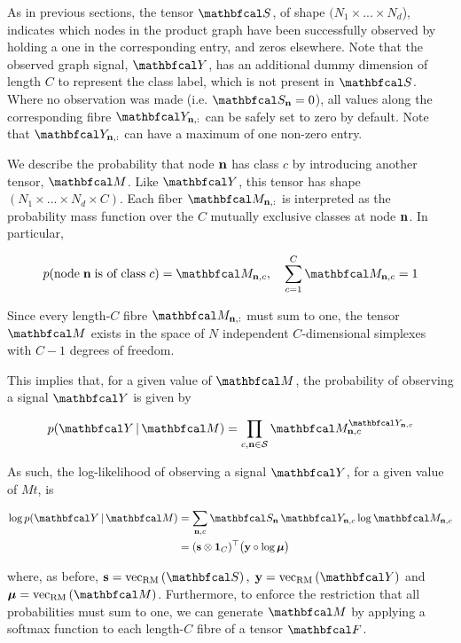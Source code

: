 As in previous sections, the tensor $\St$, of shape $(N_1 \times ... \times N_d$), indicates which nodes in the product graph have been successfully observed by holding a one in the corresponding entry, and zeros elsewhere. Note that the observed graph signal, $\Yt$, has an additional dummy dimension of length $C$ to represent the class label, which is not present in $\St$. Where no observation was made (i.e. $\St_{\nn} = 0$), all values along the corresponding fibre $\Yt_{\nn, :}$ can be safely set to zero by default. Note that $\Yt_{\nn, :}$ can have a maximum of one non-zero entry. 

We describe the probability that node $\mathbf{n}$ has class $c$ by introducing  another tensor, $\Mt$. Like $\Yt$, this tensor has shape $(N_1 \times ... \times N_d \times C)$. Each fiber $\Mt_{\nn, :}$ is interpreted as the probability mass function over the $C$ mutually exclusive classes at node $\mathbf{n}$. In particular, 

\begin{equation*}
    p(\text{node} \; \nn \; \text{is of class} \; c) = \Mt_{\nn, c}, \quad \sum_{c=1}^C \Mt_{\nn, c} = 1
\end{equation*}

Since every length-$C$ fibre $\Mt_{\nn, :}$ must sum to one, the tensor $\Mt$ exists in the space of $N$ independent $C$-dimensional simplexes with $C-1$ degrees of freedom. 

This implies that, for a given value of $\Mt$, the probability of observing a signal $\Yt$ is given by

\begin{equation}
    p(\Yt \, | \, \Mt) = \prod_{c, \nn \in \mathcal{S}} \Mt_{\nn, c}^{\Yt_{\nn, c}}
\end{equation}

As such, the log-likelihood of observing a signal $\Yt$, for a given value of $Mt$, is

\begin{align}
    \log p(\Yt \, | \, \Mt) &= \sum_{\nn, c} \St_{\nn} \, \Yt_{\nn, c} \log \Mt_{\nn, c} \notag \\
    &= (\s \otimes \one_C)^\top \big(\y \circ \log \muu \big)
 \end{align}
 

where, as before, $\s = \vecrm{\St}, \; \y = \vecrm{\Yt}$ and $\muu = \vecrm{\Mt}$. Furthermore, to enforce the restriction that all probabilities must sum to one, we can generate $\Mt$ by applying a softmax function to each length-$C$ fibre of a tensor $\Ft$. 

